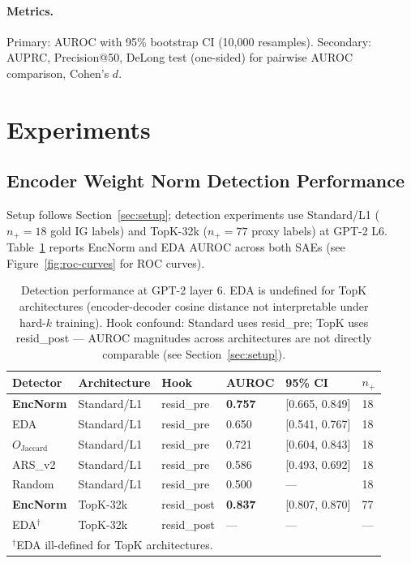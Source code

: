 \documentclass{article}
\begin{document}
\paragraph{Metrics.} Primary: AUROC with 95\% bootstrap CI (10,000 resamples). Secondary:
AUPRC, Precision@50, DeLong test (one-sided) for pairwise AUROC comparison, Cohen's $d$.

\section{Experiments}
\label{sec:experiments}

\subsection{Encoder Weight Norm Detection Performance}

Setup follows Section~\ref{sec:setup}; detection experiments use Standard/L1
($n_+=18$ gold IG labels) and TopK-32k ($n_+=77$ proxy labels) at GPT-2 L6.
Table~\ref{tab:detectors} reports EncNorm and EDA AUROC across both SAEs
(see Figure~\ref{fig:roc-curves} for ROC curves).

\begin{table}[t]
\centering
\caption{Detection performance at GPT-2 layer 6. EDA is undefined for TopK architectures
  (encoder-decoder cosine distance not interpretable under hard-$k$ training). Hook confound:
  Standard uses resid\_pre; TopK uses resid\_post --- AUROC magnitudes across architectures
  are not directly comparable (see Section~\ref{sec:setup}).}
\label{tab:detectors}
\begin{tabular}{llllll}
\toprule
Detector & Architecture & Hook & AUROC & 95\% CI & $n_+$ \\
\midrule
\textbf{EncNorm} & Standard/L1 & resid\_pre & \textbf{0.757} & [0.665, 0.849] & 18 \\
EDA              & Standard/L1 & resid\_pre & 0.650 & [0.541, 0.767] & 18 \\
$O_\mathrm{Jaccard}$ & Standard/L1 & resid\_pre & 0.721 & [0.604, 0.843] & 18 \\
ARS\_v2          & Standard/L1 & resid\_pre & 0.586 & [0.493, 0.692] & 18 \\
Random           & Standard/L1 & resid\_pre & 0.500 & --- & 18 \\
\midrule
\textbf{EncNorm} & TopK-32k & resid\_post & \textbf{0.837} & [0.807, 0.870] & 77 \\
EDA$^\dagger$    & TopK-32k & resid\_post & --- & --- & --- \\
\bottomrule
\multicolumn{6}{l}{\footnotesize $^\dagger$EDA ill-defined for TopK architectures.}
\end{tabular}
\end{table}
\end{document}
